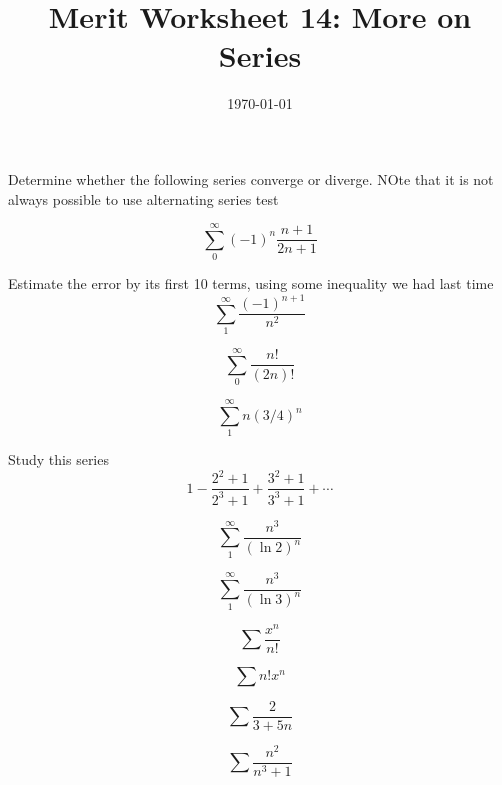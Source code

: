 
\usepackage[utf8]{inputenc}
\usepackage[english]{babel}


\title{Merit Worksheet 14: More on Series}
\date{\today}
\newcommand{\GG}{\mathfrak g}
\newcommand{\I}{\mathcal I}


\maketitle
 Determine whether the following series converge or diverge. NOte that it is not always possible to use alternating series test
 \be
 	\item $$\sum_0^\infty (-1)^n\frac{n+1}{2n+1}$$
 	\vfill
 	\item Estimate the error by its first 10 terms, using some inequality we had last time
 	$$\sum_1^\infty\frac{(-1)^{n+1}}{n^2}$$
 \vfill
 \item $$\sum_0^\infty\frac{n!}{(2n)!}$$
 \vfill
 \item $$\sum_1^\infty n(3/4)^n$$
 \vfill
 \newpage
 \item Study this series 
 $$1-\frac{2^2+1}{2^3+1}+\frac{3^2+1}{3^3+1}+\cdots$$
 \vfill
 \item $$\sum_1^\infty\frac{n^3}{(\ln2)^n}$$
 \vfill
 \item  $$\sum_1^\infty\frac{n^3}{(\ln3)^n}$$
\newpage
 \item 
    $$\sum \frac{x^n}{n!}$$
    \vfill
    \item
    $$\sum n!x^n$$
    \vfill 
    \item 
    $$\sum \frac{2}{3+5n}$$
    \vfill

    \item
    $$\sum \frac{n^2}{n^3+1}$$
 \vfill
 \ee



